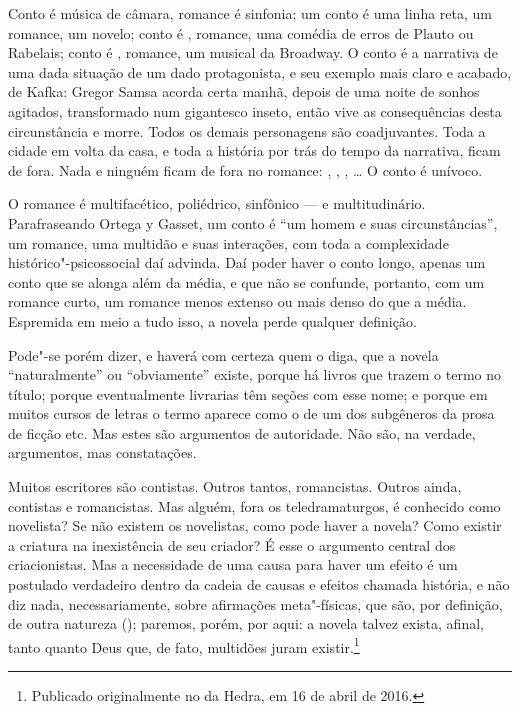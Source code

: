 \begin{changemargin}
Conto é música de câmara, romance é sinfonia; um conto é uma linha reta, um romance, um novelo; conto é {}, romance, uma comédia de erros de Plauto ou Rabelais; conto é {}, romance, um musical da Broadway. O conto é a narrativa de uma dada situação de um dado protagonista, e seu exemplo mais claro e acabado, {} de Kafka: Gregor Samsa acorda certa manhã, depois de uma noite de sonhos agitados, transformado num gigantesco inseto, então vive as consequências desta circunstância e morre. Todos os demais personagens são coadjuvantes. Toda a cidade em volta da casa, e toda a história por trás do tempo da narrativa, ficam de fora. Nada e ninguém ficam de fora no romance: {}, {}, {}, {}\ldots{} O conto é unívoco. 

O romance é multifacético, poliédrico, sinfônico --- e multitudinário. Parafraseando Ortega y Gasset, um conto é ``um homem e suas circunstâncias'', um romance, uma multidão e suas interações, com toda a complexidade histórico"-psicossocial daí advinda. Daí poder haver o conto longo, apenas um conto que se alonga além da média, e que não se confunde, portanto, com um romance curto, um romance menos extenso ou mais denso do que a média. Espremida em meio a tudo isso, a novela perde qualquer definição.

Pode"-se porém dizer, e haverá com certeza quem o diga, que a novela ``naturalmente'' ou ``obviamente'' existe, porque há livros que trazem o termo no título; porque eventualmente livrarias têm seções com esse nome; e porque em muitos cursos de letras o termo aparece como o de um dos subgêneros da prosa de ficção etc. Mas estes são argumentos de autoridade. Não são, na verdade, argumentos, mas constatações.

Muitos escritores são contistas. Outros tantos, romancistas. Outros ainda, contistas e romancistas. Mas alguém, fora os teledramaturgos, é conhecido como novelista? Se não existem os novelistas, como pode haver a novela? Como existir a criatura na inexistência de seu criador? É esse o argumento central dos criacionistas. Mas a necessidade de uma causa para haver um efeito é um postulado verdadeiro dentro da cadeia de causas e efeitos chamada história, e não diz nada, necessariamente, sobre afirmações meta"-físicas, que são, por definição, de outra natureza ({}); paremos, porém, por aqui: a novela talvez exista, afinal, tanto quanto Deus que, de fato, multidões juram existir.\footnote{Publicado originalmente no {} da Hedra, em 16 de abril de 2016.}


\pagebreak

\end{changemargin}

